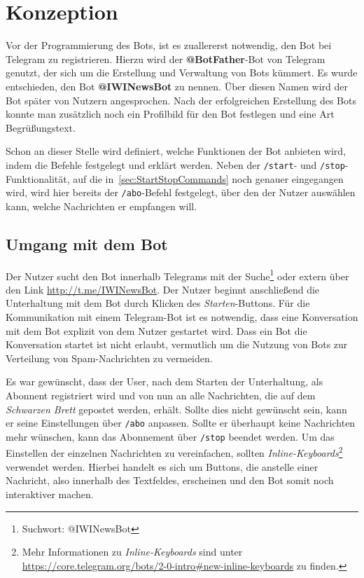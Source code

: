 \chapter{Konzeption}
Vor der Programmierung des Bots, ist es zuallererst notwendig, den Bot bei Telegram zu registrieren. Hierzu wird der \textbf{@BotFather}-Bot von Telegram genutzt, der sich um die Erstellung und Verwaltung von Bots kümmert. Es wurde entschieden, den Bot \textbf{@IWINewsBot} zu nennen. Über diesen Namen wird der Bot später von Nutzern angesprochen. Nach der erfolgreichen Erstellung des Bots konnte man zusätzlich noch ein Profilbild für den Bot festlegen und eine Art Begrüßungstext.

Schon an dieser Stelle wird definiert, welche Funktionen der Bot anbieten wird, indem die Befehle festgelegt und erklärt werden. Neben der \texttt{/start}- und \texttt{/stop}-Funktionalität, auf die in~\autoref{sec:StartStopCommands} noch genauer eingegangen wird, wird hier bereits der \texttt{/abo}-Befehl festgelegt, über den der Nutzer auswählen kann, welche Nachrichten er empfangen will.

\section{Umgang mit dem Bot}
Der Nutzer sucht den Bot innerhalb Telegrams mit der Suche\footnote{Suchwort: @IWINewsBot} oder extern über den Link \url{http://t.me/IWINewsBot}.
Der Nutzer beginnt anschließend die Unterhaltung mit dem Bot durch Klicken des \textit{Starten}-Buttons.
Für die Kommunikation mit einem Telegram-Bot ist es notwendig, dass eine Konversation mit dem Bot explizit von dem Nutzer gestartet wird. Dass ein Bot die Konversation startet ist nicht erlaubt, vermutlich um die Nutzung von Bots zur Verteilung von Spam-Nachrichten zu vermeiden.

Es war gewünscht, dass der User, nach dem Starten der Unterhaltung, als Abonnent registriert wird und von nun an alle Nachrichten, die auf dem \emph{Schwarzen Brett} gepostet werden, erhält. Sollte dies nicht gewünscht sein, kann er seine Einstellungen über \texttt{/abo} anpassen. Sollte er überhaupt keine Nachrichten mehr wünschen, kann das Abonnement über \texttt{/stop} beendet werden. Um das Einstellen der einzelnen Nachrichten zu vereinfachen, sollten \emph{Inline-Keyboards}\footnote{Mehr Informationen zu \emph{Inline-Keyboards} sind unter \url{https://core.telegram.org/bots/2-0-intro\#new-inline-keyboards} zu finden.} verwendet werden. Hierbei handelt es sich um Buttons, die anstelle einer Nachricht, also innerhalb des Textfeldes, erscheinen und den Bot somit noch interaktiver machen.


